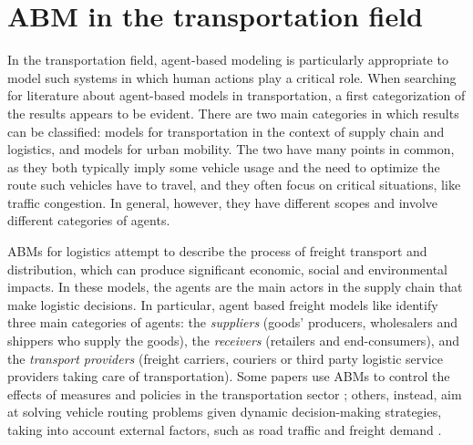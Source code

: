 
\section{ABM in the transportation field} \label{abm-t}
In the transportation field, agent-based modeling is particularly appropriate to model such systems in which human actions play a critical role. When searching for literature about agent-based models in transportation, a first categorization of the results appears to be evident. There are two main categories in which results can be classified: models for transportation in the context of supply chain and logistics, and models for urban mobility. The two have many points in common, as they both typically imply some vehicle usage and the need to optimize the route such vehicles have to travel, and they often focus on critical situations, like traffic congestion. In general, however, they have different scopes and involve different categories of agents. 

ABMs for logistics attempt to describe the process of freight transport and distribution, which can produce significant economic, social and environmental impacts. In these models, the agents are the main actors in the supply chain that make logistic decisions. In particular, agent based freight models like \cite{log1, log2} identify three main categories of agents: the \textit{suppliers} (goods' producers, wholesalers and shippers who supply the goods), the \textit{receivers} (retailers and end-consumers), and the \textit{transport providers} (freight carriers, couriers or third party logistic service providers taking care of transportation). Some papers use ABMs to control the effects of measures and policies in the transportation sector \cite{log3, log4}; others, instead, aim at solving vehicle routing problems given dynamic decision-making strategies, taking into account external factors, such as road traffic and freight demand \cite{log5}. 

